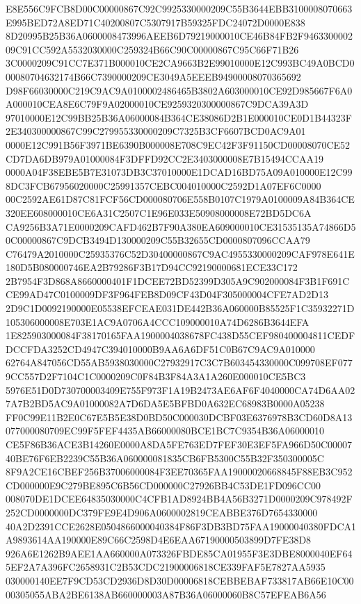 \documentclass[UTF8,fontset=fandol,zihao=-4,a4paper]{ctexart}
\begin{document}
{{E8E556C9FCB8D00C00000867C92C9925330000209C55B3644EBB3100008070663E995BED72A8ED71C40200807C5307917B59325FDC24072D0000E838
8D20995B25B36A0600008473996AEEB6D79219000010CE46B84FB2F946330000209C91CC592A5532030000C259324B66C90C00000867C95C66F71B26
3C0000209C91CC7E371B000010CE2CA9663B2E99010000E12C993BC49A0BCD000080704632174B66C7390000209CE3049A5EEEB94900008070365692
D98F66030000C219C9AC9A0100002486465B3802A603000010CE92D985667F6A0A000010CEA8E6C79F9A02000010CE9259320300000867C9DCA39A3D
97010000E12C99BB25B36A06000084B364CE38086D2B1E000010CE0D1B44323F2E340300000867C99C279955330000209C7325B3CF6607BCD0AC9A01
0000E12C991B56F3971BE6390B000008E708C9EC42F3F91150CD00008070CE52CD7DA6DB979A01000084F3DFFD92CC2E3403000008E7B15494CCAA19
0000A04F38EBE5B7E31073DB3C37010000E1DCAD16BD75A09A010000E12C998DC3FCB67956020000C25991357CEBC004010000C2592D1A07EF6C0000
00C2592AE61D87C81FCF56CD000080706E558B0107C1979A0100009A84B364CE320EE608000010CE6A31C2507C1E96E033E50908000008E72BD5DC6A
CA9256B3A71E0000209CAFD462B7F90A380EA609000010CE31535135A74866D50C00000867C9DCB3494D130000209C55B32655CD0000807096CCAA79
C76479A2010000C25935376C52D30400000867C9AC4955330000209CAF978E641E180D5B080000746EA2B79286F3B17D94CC92190000681ECE33C172
2B7954F3D868A8660000401F1DCEE72BD52399D305A9C902000084F3B1F691CCE99AD47C0100009DF3F964FEB8D09CF43D04F305000004CFE7AD2D13
2D9C1D0092190000E05538EFCEAE031DE442B36A060000B85525F1C35932271D105306000008E703E1AC9A0706A4CCC109000010A74D6286B3644EFA
1E825903000084F38170165FAA1900004038678FC438D55CEF980400004811CEDFDCCFDA3252CD4947C394010000B9AA6A6DF51C0B67C9AC9A010000
62764A847056CD55AB5938030000C27932917C3C7B603454330000C099708EF0779CC557D2F7104C1C0000209C0F84B3F84A3A1A260E000010CE5BC3
5976E51D0D730700003409E755F973F1A19B2473AE6AF6F4040000CA74D6AA027A7B2BD5AC9A01000082A7D6DA5E5BFBD0A632EC68983B0000A05238
FF0C99E11B2E0C67E5B5E38D0BD50C000030DCBF03E6376978B3CD60D8A13077000080709EC99F5FEF4435AB66000080BCE1BC7C9354B36A06000010
CE5F86B36ACE3B14260E0000A8DA5FE763ED7FEF30E3EF5FA966D50C0000740BE76F6EB2239C55B36A060000081835CB6FB5300C55B32F350300005C
8F9A2CE16CBEF256B37006000084F3EE70365FAA19000020668845F88EB3C952CD000000E9C279BE895C6B56CD000000C27926BB4C53DE1FD096CC00
008070DE1DCEE64835030000C4CFB1AD8924BB4A56B3271D0000209C978492F252CD0000000DC379FE9E4D906A0600002819CEABBE376D7654330000
40A2D2391CCE2628E0504866000040384F86F3DB3BD75FAA19000040380FDCA1A9893614AA190000E89C66C2598D4E6EAA67190000503899D7FE38D8
926A6E1262B9AEE1AA660000A073326FBDE85CA01955F3E3DBE8000040EF645EF2A7A396FC2658931C2B53CDC21900006818CE339FAF5E7827AA5935
030000140EE7F9CD53CD2936D8D30D00006818CEBBEBAF733817AB66E10C0000305055ABA2BE6138AB660000003A87B36A06000060B8C57EFEAB6A56
}}
\end{document}
